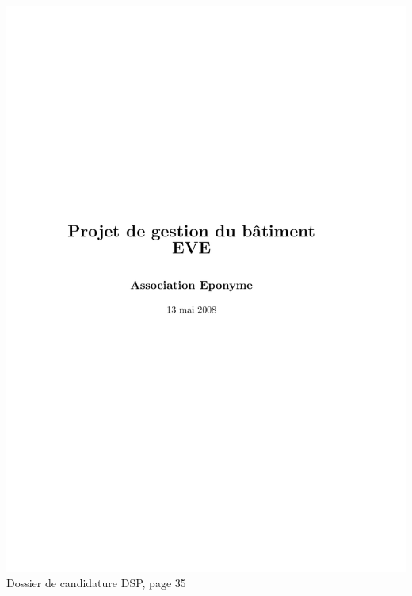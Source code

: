 \includegraphics[scale=0.85,trim=20mm 20mm 20mm 20mm,clip,page=35]{annexes/candidature_dsp.pdf} \\
Dossier de candidature DSP, page 35
\newpage
